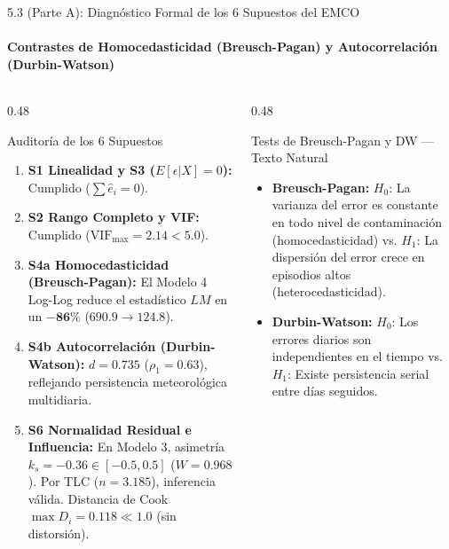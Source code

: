 \documentclass[aspectratio=169, 9pt]{beamer}
\begin{document}
\begin{frame}{5.3 (Parte A): Diagnóstico Formal de los 6 Supuestos del EMCO}
\framesubtitle{Contrastes de Homocedasticidad (Breusch-Pagan) y Autocorrelación (Durbin-Watson)}

\begin{columns}[T]
  \begin{column}{0.48\textwidth}
    \begin{block}{\footnotesize Auditoría de los 6 Supuestos}
      \scriptsize
      \begin{enumerate}\setlength{\itemsep}{1.5pt}
        \item \textbf{S1 Linealidad y S3 ($E[\epsilon|X]=0$):} Cumplido ($\sum \hat{e}_i = 0$).
        \item \textbf{S2 Rango Completo y VIF:} Cumplido ($\text{VIF}_{\max} = 2.14 < 5.0$).
        \item \textbf{S4a Homocedasticidad (Breusch-Pagan):} El Modelo 4 Log-Log reduce el estadístico $LM$ en un $\mathbf{-86\%}$ ($690.9 \to 124.8$).
        \item \textbf{S4b Autocorrelación (Durbin-Watson):} $d = 0.735$ ($\rho_1 = 0.63$), reflejando persistencia meteorológica multidiaria.
        \item \textbf{S6 Normalidad Residual e Influencia:} En Modelo 3, asimetría $k_s = \mathbf{-0.36} \in [-0.5, 0.5]$ ($W = 0.968$). Por TLC ($n=3.185$), inferencia válida. Distancia de Cook $\max D_i = \mathbf{0.118 \ll 1.0}$ (sin distorsión).
      \end{enumerate}
    \end{block}
  \end{column}

  \begin{column}{0.48\textwidth}
    \begin{alertblock}{\footnotesize Tests de Breusch-Pagan y DW — Texto Natural}
      \scriptsize
      \begin{itemize}\setlength{\itemsep}{1pt}
        \item \textbf{Breusch-Pagan:} $H_0$: La varianza del error es constante en todo nivel de contaminación (homocedasticidad) vs. $H_1$: La dispersión del error crece en episodios altos (heterocedasticidad).
        \item \textbf{Durbin-Watson:} $H_0$: Los errores diarios son independientes en el tiempo vs. $H_1$: Existe persistencia serial entre días seguidos.
      \end{itemize}
    \end{alertblock}


\end{column}
\end{columns}
\end{frame}
\end{document}

